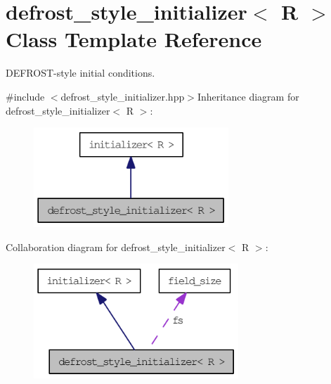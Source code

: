\hypertarget{classdefrost__style__initializer}{
\section{defrost\_\-style\_\-initializer$<$ R $>$ Class Template Reference}
\label{classdefrost__style__initializer}
}


DEFROST-\/style initial conditions.  


{\ttfamily \#include $<$defrost\_\-style\_\-initializer.hpp$>$}Inheritance diagram for defrost\_\-style\_\-initializer$<$ R $>$:\nopagebreak
\begin{figure}[H]
\begin{center}
\leavevmode
\includegraphics[width=208pt]{classdefrost__style__initializer__inherit__graph}
\end{center}
\end{figure}
Collaboration diagram for defrost\_\-style\_\-initializer$<$ R $>$:\nopagebreak
\begin{figure}[H]
\begin{center}
\leavevmode
\includegraphics[width=218pt]{classdefrost__style__initializer__coll__graph}
\end{center}
\end{figure}

